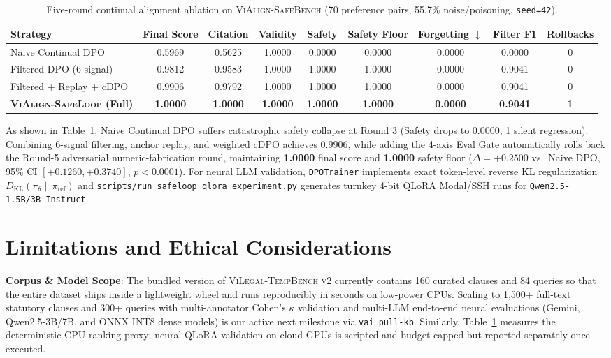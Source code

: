 \documentclass[11pt,a4paper]{article}
\begin{document}
\begin{table}[t]
\centering
\small
\caption{Five-round continual alignment ablation on \textsc{ViAlign-SafeBench} (70 preference pairs, 55.7\% noise/poisoning, \texttt{seed=42}).}
\label{tab:vialign_safebench}
\begin{tabular}{lcccccccc}
\toprule
Strategy & Final Score & Citation & Validity & Safety & Safety Floor & Forgetting $\downarrow$ & Filter F1 & Rollbacks \\
\midrule
Naive Continual DPO & 0.5969 & 0.5625 & 1.0000 & 0.0000 & 0.0000 & 0.0000 & 0.0000 & 0 \\
Filtered DPO (6-signal) & 0.9812 & 0.9583 & 1.0000 & 1.0000 & 1.0000 & 0.0000 & 0.9041 & 0 \\
Filtered + Replay + cDPO & 0.9906 & 0.9792 & 1.0000 & 1.0000 & 1.0000 & 0.0000 & 0.9041 & 0 \\
\textbf{\textsc{ViAlign-SafeLoop} (Full)} & \textbf{1.0000} & \textbf{1.0000} & \textbf{1.0000} & \textbf{1.0000} & \textbf{1.0000} & \textbf{0.0000} & \textbf{0.9041} & \textbf{1} \\
\bottomrule
\end{tabular}
\end{table}

As shown in Table~\ref{tab:vialign_safebench}, Naive Continual DPO suffers catastrophic safety collapse at Round 3 (Safety drops to 0.0000, 1 silent regression). Combining 6-signal filtering, anchor replay, and weighted cDPO achieves 0.9906, while adding the 4-axis Eval Gate automatically rolls back the Round-5 adversarial numeric-fabrication round, maintaining \textbf{1.0000} final score and \textbf{1.0000} safety floor ($\Delta = +0.2500$ vs.\ Naive DPO, 95\% CI $[+0.1260, +0.3740]$, $p < 0.0001$). For neural LLM validation, \texttt{DPOTrainer} implements exact token-level reverse KL regularization $D_{\mathrm{KL}}(\pi_\theta \| \pi_{\mathrm{ref}})$ and \texttt{scripts/run\_safeloop\_qlora\_experiment.py} generates turnkey 4-bit QLoRA Modal/SSH runs for \texttt{Qwen2.5-1.5B/3B-Instruct}.

\section{Limitations and Ethical Considerations}
\textbf{Corpus & Model Scope}: The bundled version of \textsc{ViLegal-TempBench v2} currently contains 160 curated clauses and 84 queries so that the entire dataset ships inside a lightweight wheel and runs reproducibly in seconds on low-power CPUs. Scaling to 1,500+ full-text statutory clauses and 300+ queries with multi-annotator Cohen's $\kappa$ validation and multi-LLM end-to-end neural evaluations (Gemini, Qwen2.5-3B/7B, and ONNX INT8 dense models) is our active next milestone via \texttt{vai pull-kb}. Similarly, Table~\ref{tab:vialign_safebench} measures the deterministic CPU ranking proxy; neural QLoRA validation on cloud GPUs is scripted and budget-capped but reported separately once executed.
\end{document}
